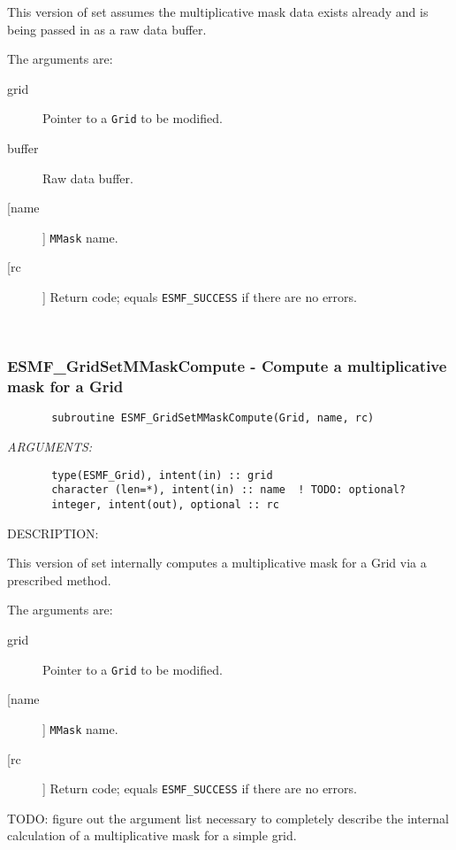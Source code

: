 {       This version of set assumes the multiplicative mask data exists already
       and is being passed in as a raw data buffer.
  
       The arguments are:
       \begin{description}
       \item[grid] 
            Pointer to a {\tt Grid} to be modified.
       \item[buffer]
            Raw data buffer.         
       \item [[name]]
             {\tt MMask} name.
       \item[[rc]] 
            Return code; equals {\tt ESMF\_SUCCESS} if there are no errors.
       \end{description}
   
 
\mbox{}\hrulefill\ 
 
\subsubsection{ESMF\_GridSetMMaskCompute - Compute a multiplicative mask for a Grid}


 
\begin{verbatim}       subroutine ESMF_GridSetMMaskCompute(Grid, name, rc)\end{verbatim}{\em ARGUMENTS:}
\begin{verbatim}       type(ESMF_Grid), intent(in) :: grid
       character (len=*), intent(in) :: name  ! TODO: optional?
       integer, intent(out), optional :: rc            \end{verbatim}
{\sf DESCRIPTION:\\ }


       This version of set internally computes a multiplicative mask for a
       Grid via a prescribed method.
  
       The arguments are:
       \begin{description}
       \item[grid] 
            Pointer to a {\tt Grid} to be modified.
       \item [[name]]
             {\tt MMask} name.
       \item[[rc]] 
            Return code; equals {\tt ESMF\_SUCCESS} if there are no errors.
       \end{description}
  
  TODO: figure out the argument list necessary to completely describe the 
        internal calculation of a multiplicative mask for a simple grid. 
 
}

